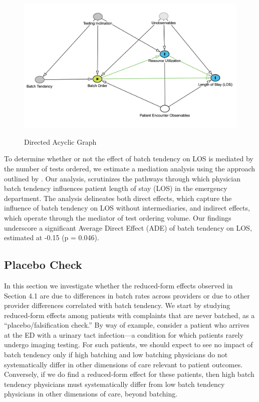\documentclass[,,nonblindrev]{informs}
\begin{document}
\begin{figure}[h]
  \centering
  \caption{Directed Acyclic Graph}
  \label{fig:DAG}
  \includegraphics[width=6in]{../outputs/figures/dagitty.png}
\begin{tablenotes}
\small
\item \textit{}
\end{tablenotes}  
\end{figure}

To determine whether or not the effect of batch tendency on LOS is
mediated by the number of tests ordered, we estimate a mediation
analysis using the approach outlined by \citet{imai2010general}. Our
analysis, scrutinizes the pathways through which physician batch
tendency influences patient length of stay (LOS) in the emergency
department. The analysis delineates both direct effects, which capture
the influence of batch tendency on LOS without intermediaries, and
indirect effects, which operate through the mediator of test ordering
volume. Our findings underscore a significant Average Direct Effect
(ADE) of batch tendency on LOS, estimated at -0.15 (p = 0.046).

\hypertarget{placebo-check}{%
\subsection{Placebo Check}\label{placebo-check}}

In this section we investigate whether the reduced-form effects observed
in Section 4.1 are due to differences in batch rates across providers or
due to other provider differences correlated with batch tendency. We
start by studying reduced-form effects among patients with complaints
that are never batched, as a ``placebo/falsification check.'' By way of
example, consider a patient who arrives at the ED with a urinary tact
infection---a condition for which patients rarely undergo imaging
testing. For such patients, we should expect to see no impact of batch
tendency only if high batching and low batching physicians do not
systematically differ in other dimensions of care relevant to patient
outcomes. Conversely, if we do find a reduced-form effect for these
patients, then high batch tendency physicians must systematically differ
from low batch tendency physicians in other dimensions of care, beyond
batching.
\end{document}
